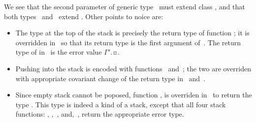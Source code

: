 We see that the second parameter of generic type~ must extend class ,
  and that both types~ and~ extend .
Other points to noice are:
\begin{itemize}
  \item The type at the top of the stack is precisely the return type of function ;
        it is overridden in~ so that its return type is the first argument of~.
        The return type of  in~ is the error value {$Γ'$.¤}.
  \item Pushing into the stack is encoded with functions~ and~;
        the two are overriden with appropriate covariant change of the return type in~ and~.
  \item Since empty stack cannot be poposed, function , is overriden in~ to return
        the type . This type is indeed a kind of a stack, except that all four stack  
        functions: , ,~, and,~, return the appropriate error type.
\end{itemize}
